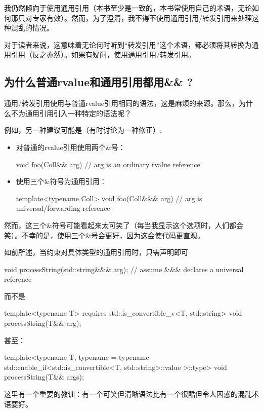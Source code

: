 我仍然倾向于使用通用引用（本书至少是一致的，本书常使用自己的术语，无论如何那只对专家有效）。然而，为了澄清，我不得不使用通用引用/转发引用来处理这种混乱的情况。

对于读者来说，这意味着无论何时听到“转发引用”这个术语，都必须将其转换为通用引用（反之亦然）。如果有疑问，使用通用引用/转发引用。

\subsection{为什么普通rvalue和通用引用都用\&\& ?}

通用/转发引用使用与普通rvalue引用相同的语法，这是麻烦的来源。那么，为什么不为通用引用引入一种特定的语法呢？

例如，另一种建议可能是（有时讨论为一种修正）:

\begin{itemize}
\item 对普通的rvalue引用使用两个\&号：
\begin{cppcode}
void foo(Coll&& arg) // arg is an ordinary rvalue reference
\end{cppcode}
\item 使用三个\&符号为通用引用：
\begin{cppcode}
template<typename Coll>
void foo(Coll&&& arg) // arg is universal/forwarding reference
\end{cppcode}
\end{itemize}

然而，这三个\&符号可能看起来太可笑了（每当我显示这个选项时，人们都会笑）。不幸的是，使用三个\&号会更好，因为这会使代码更直观。

如前所述，当约束对具体类型的通用引用时，只需声明即可

\begin{cppcode}
void processString(std::string&&& arg); // assume &&& declares a universal reference
\end{cppcode}

而不是

\begin{cppcode}
template<typename T>
requires std::is_convertible_v<T, std::string>
void processString(T&& arg);
\end{cppcode}

甚至：

\begin{cppcode}
template<typename T,
	typename =
		typename std::enable_if<std::is_convertible<T, std::string>::value
			>::type>
void processString(T&& args);
\end{cppcode}

这里有一个重要的教训：有一个可笑但清晰语法比有一个很酷但令人困惑的混乱术语要好。

















